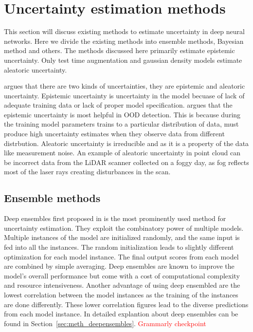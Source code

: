     \section{Uncertainty estimation methods}
    This section will discuss existing methods to estimate uncertainty in deep neural networks.
    Here we divide the existing methods into ensemble methods, Bayesian method and others.
    The methods discussed here primarily estimate epistemic uncertainty. Only test time augmentation and gaussian density models estimate aleatoric uncertainty.

    \cite{matias_uncertainty} argues that there are two kinds of uncertainties, they are epistemic and aleatoric uncertainty.
    Epistemic uncertainty is uncertainty in the model becuase of lack of adequate training data or lack of proper model specification.
    \cite{matias_uncertainty} argues that the epistemic uncertainty is most helpful in OOD detection.
    This is because during the training model parameters trains to a particular distribution of data, must produce high uncertainty estimates when they observe data from different distrbution.
    Aleatoric uncertainty is irreducible and as it is a property of the data like measurement noise.
    An example of aleatoric uncertainty in point cloud can be incorrect data from the LiDAR scanner collected on a foggy day, as fog reflects most of the laser rays creating disturbances in the scan.
    \subsection{Ensemble methods}
    Deep ensembles first proposed in  \cite{lakshminarayanan2016simple} is the most prominently used method for uncertainty estimation.
    They exploit the combinatory power of multiple models.
    Multiple instances of the model are initialized randomly, and the same input is fed into all the instances.
    The random initialization leads to slightly different optimization for each model instance. The final output scores from each model are combined by simple averaging.
    Deep ensembles are known to improve the model's overall performance but come with a cost of computational complexity and resource intensiveness.
    Another advantage of using deep ensembled are the lowest correlation between the model instances as the training of the instances are done differently.
    These lower correlation figures lead to the diverse predictions from each model instance.
    In detailed explantion about deep ensembles can be found in Section~\ref{sec:meth_deepensembles}.
\textcolor{red}{Grammarly checkpoint}

